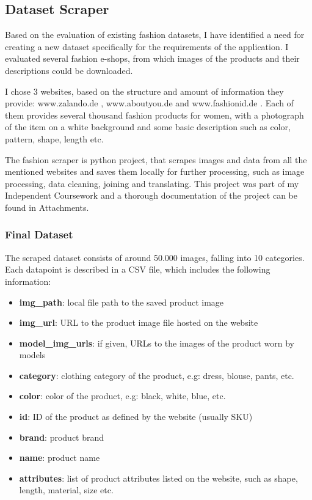 \documentclass{article}
\begin{document}
\subsection{Dataset Scraper}
Based on the evaluation of existing fashion datasets, I have identified a need for creating a new dataset specifically for the requirements of the application. I evaluated several fashion e-shops, from which images of the products and their descriptions could be downloaded. 

I chose 3 websites, based on the structure and amount of information they provide: www.zalando.de \cite{zalando_damenmode_nodate}, www.aboutyou.de \cite{about_you_mode_nodate} and www.fashionid.de \cite{p&c_damen_nodate}. Each of them provides several thousand fashion products for women, with a photograph of the item on a white background and some basic description such as color, pattern, shape, length etc.

The fashion scraper is python project, that scrapes images and data from all the mentioned websites and saves them locally for further processing, such as image processing, data cleaning, joining and translating. This project was part of my Independent Coursework and a thorough documentation of the project can be found in Attachments.

\subsubsection{Final Dataset}
The scraped dataset consists of around 50.000 images, falling into 10 categories. 
Each datapoint is described in a CSV file, which includes the following information:

\begin{itemize}
\item \textbf{img\_path}: local file path to the saved product image
\item \textbf{img\_url}: URL to the product image file hosted on the website
\item \textbf{model\_img\_urls}: if given, URLs to the images of the product worn by models
\item \textbf{category}: clothing category of the product, e.g: dress, blouse, pants, etc.
\item \textbf{color}: color of the product, e.g: black, white, blue, etc.
\item \textbf{id}: ID of the product as defined by the website (usually SKU)
\item \textbf{brand}: product brand
\item \textbf{name}: product name
\item \textbf{attributes}: list of product attributes listed on the website, such as shape, length, material, size etc.
\end{itemize}
\end{document}
